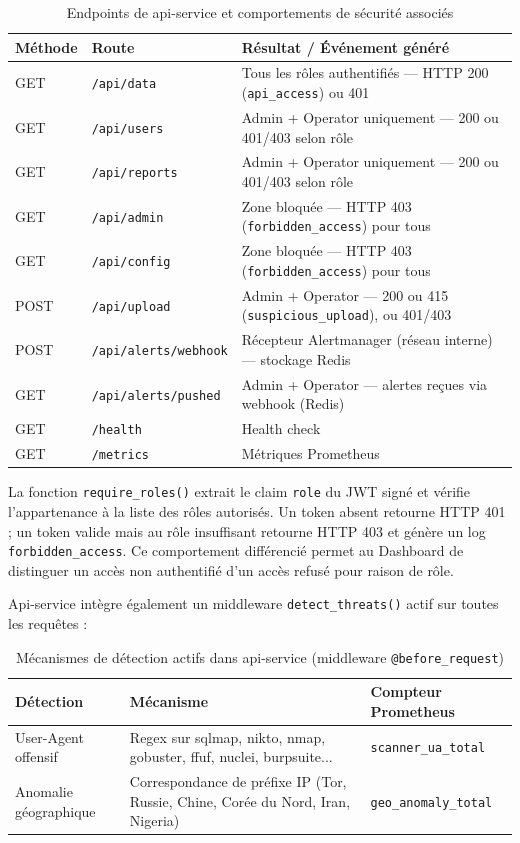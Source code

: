 \documentclass[12pt, a4paper]{report}
\begin{document}
\begin{table}[H]
  \centering
  \caption{Endpoints de api-service et comportements de sécurité associés}
  \begin{tabular}{@{}lll@{}}
    \toprule
    \textbf{Méthode} & \textbf{Route} & \textbf{Résultat / Événement généré} \\
    \midrule
    GET  & \texttt{/api/data}    & Tous les rôles authentifiés — HTTP 200 (\texttt{api\_access}) ou 401 \\
    GET  & \texttt{/api/users}   & Admin + Operator uniquement — 200 ou 401/403 selon rôle \\
    GET  & \texttt{/api/reports} & Admin + Operator uniquement — 200 ou 401/403 selon rôle \\
    GET  & \texttt{/api/admin}   & Zone bloquée — HTTP 403 (\texttt{forbidden\_access}) pour tous \\
    GET  & \texttt{/api/config}  & Zone bloquée — HTTP 403 (\texttt{forbidden\_access}) pour tous \\
    POST & \texttt{/api/upload}  & Admin + Operator — 200 ou 415 (\texttt{suspicious\_upload}), ou 401/403 \\
    POST & \texttt{/api/alerts/webhook} & Récepteur Alertmanager (réseau interne) — stockage Redis \\
    GET  & \texttt{/api/alerts/pushed}  & Admin + Operator — alertes reçues via webhook (Redis) \\
    GET  & \texttt{/health}      & Health check \\
    GET  & \texttt{/metrics}     & Métriques Prometheus \\
    \bottomrule
  \end{tabular}
\end{table}

La fonction \texttt{require\_roles()} extrait le claim \texttt{role} du JWT signé et vérifie l'appartenance à la liste des rôles autorisés. Un token absent retourne HTTP 401 ; un token valide mais au rôle insuffisant retourne HTTP 403 et génère un log \texttt{forbidden\_access}. Ce comportement différencié permet au Dashboard de distinguer un accès non authentifié d'un accès refusé pour raison de rôle.

Api-service intègre également un middleware \texttt{detect\_threats()} actif sur toutes les requêtes :

\begin{table}[H]
  \centering
  \caption{Mécanismes de détection actifs dans api-service (middleware \texttt{@before\_request})}
  \begin{tabularx}{\textwidth}{@{}lXl@{}}
    \toprule
    \textbf{Détection} & \textbf{Mécanisme} & \textbf{Compteur Prometheus} \\
    \midrule
    User-Agent offensif & Regex sur sqlmap, nikto, nmap, gobuster, ffuf, nuclei, burpsuite... & \texttt{scanner\_ua\_total} \\
    Anomalie géographique & Correspondance de préfixe IP (Tor, Russie, Chine, Corée du Nord, Iran, Nigeria) & \texttt{geo\_anomaly\_total} \\
    \bottomrule
  \end{tabularx}
\end{table}
\end{document}
